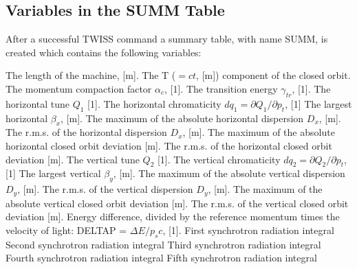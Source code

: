 \subsection{Variables in the SUMM Table}
\label{subsec:tables_summ}
After a successful TWISS command a summary table, with name SUMM, is created which
contains the following variables:  

\begin{5.02.05}
\begin{madlist}
   The length of the machine, [m].     
   The T ($= c t$, [m]) component of the closed orbit.     
   The momentum compaction factor $\alpha_c$, [1].     
   The transition energy $\gamma_{tr}$, [1].     
   The horizontal tune $Q_1$ [1].     
   The horizontal chromaticity $dq_1 = \partial Q_1 / \partial p_t$, [1]
   The largest horizontal $\beta_x$, [m].     
   The maximum of the absolute horizontal dispersion $D_x$, [m].     
   The r.m.s. of the horizontal dispersion $D_x$, [m].     
   The maximum of the absolute horizontal closed orbit deviation [m].     
   The r.m.s. of the horizontal closed orbit deviation [m].     
   The vertical tune $Q_2$ [1].     
   The vertical chromaticity $dq_2 = \partial Q_2 / \partial p_t$, [1]
   The largest vertical $\beta_y$, [m].     
   The maximum of the absolute vertical dispersion $D_y$, [m].     
   The r.m.s. of the vertical dispersion $D_y$, [m].     
   The maximum of the absolute vertical closed orbit deviation [m].     
   The r.m.s. of the vertical closed orbit deviation [m].     
   Energy difference, divided by the reference
  momentum times the velocity of light: DELTAP = $\Delta E / p_s c$, [1].
   First synchrotron radiation integral  
   Second synchrotron radiation integral  
   Third synchrotron radiation integral  
   Fourth synchrotron radiation integral  
   Fifth synchrotron radiation integral  
\end{madlist} 
\end{5.02.05}

